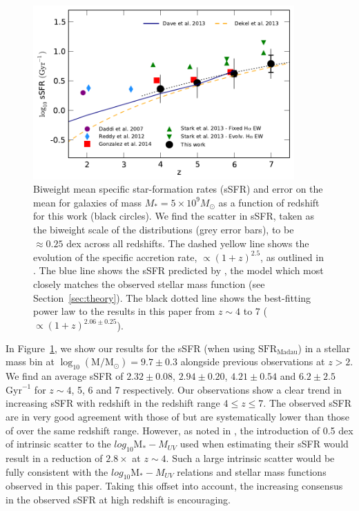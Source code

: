 \begin{figure}
\centering
\includegraphics[width=100mm]{plots/fig13.pdf}
\caption[Short caption]{Biweight mean specific star-formation rates (sSFR) and error on the mean for galaxies of mass $M_{*} = 5 \times 10^9 M_{\odot}$ as a function of redshift for this work (black circles). We find the scatter in sSFR, taken as the biweight scale of the distributions (grey error bars), to be $\approx 0.25$ dex across all redshifts. The dashed yellow line shows the evolution of the specific accretion rate, $\propto (1 + z)^{2.5}$, as outlined in \citet{Dekel:2013id}. The blue line shows the sSFR predicted by \citet{Dave:2013bf}, the model which most closely matches the observed stellar mass function (see Section~\ref{sec:theory}). The black dotted line shows the best-fitting power law to the results in this paper from $z \sim 4$ to 7 ($\propto (1 + z)^{2.06 \pm 0.25}$).}
\label{fig:ssfr_evolution}
\end{figure}

In Figure~\ref{fig:ssfr_evolution}, we show our results for the sSFR (when using $\text{SFR}_{\text{Madau}}$) in a stellar mass bin at $\log_{10}(\text{M} / \text{M}_{\odot}) = 9.7 \pm 0.3$ alongside previous observations at $z > 2$. We find an average sSFR of $2.32\pm0.08$, $2.94\pm0.20$, $4.21\pm0.54$ and $6.2\pm2.5$ $\text{Gyr}^{-1}$ for $z\sim 4$, 5, 6 and 7 respectively. Our observations show a clear trend in increasing sSFR with redshift in the redshift range $4 \leq z \leq 7$. The observed sSFR are in very good agreement with those of \citet{Gonzalez:2014do} but are systematically lower than those of \citet{Stark:2013ix} over the same redshift range. However, as noted in \citet{Stark:2013ix}, the introduction of 0.5 dex of intrinsic scatter to the $log_{10}\text{M}_{*}-M_{UV}$ used when estimating their sSFR would result in a reduction of $2.8\times$ at $z\sim4$. Such a large intrinsic scatter would be fully consistent with the $log_{10}\text{M}_{*}-M_{UV}$ relations and stellar mass functions observed in this paper. Taking this offset into account, the increasing consensus in the observed sSFR at high redshift is encouraging.
 
